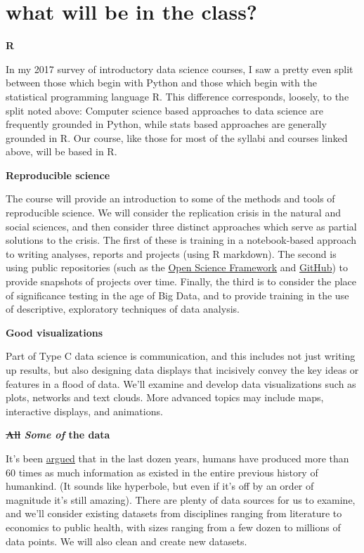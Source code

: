 \documentclass[openany]{book}
\begin{document}
\hypertarget{what-will-be-in-the-class}{%
\section*{what will be in the class?}\label{what-will-be-in-the-class}}

\textbf{R}

In my 2017 survey of introductory data science courses, I saw a pretty even split between those which begin with Python and those which begin with the statistical programming language R. This difference corresponds, loosely, to the split noted above: Computer science based approaches to data science are frequently grounded in Python, while stats based approaches are generally grounded in R. Our course, like those for most of the syllabi and courses linked above, will be based in R.

\textbf{Reproducible science}

The course will provide an introduction to some of the methods and tools of reproducible science. We will consider the replication crisis in the natural and social sciences, and then consider three distinct approaches which serve as partial solutions to the crisis. The first of these is training in a notebook-based approach to writing analyses, reports and projects (using R markdown). The second is using public repositories (such as the \href{https://osf.io/}{Open Science Framework} and \href{https://github.com/}{GitHub}) to provide snapshots of projects over time. Finally, the third is to consider the place of significance testing in the age of Big Data, and to provide training in the use of descriptive, exploratory techniques of data analysis.

\textbf{Good visualizations}

Part of Type C data science is communication, and this includes not just writing up results, but also designing data displays that incisively convey the key ideas or features in a flood of data. We'll examine and develop data visualizations such as plots, networks and text clouds. More advanced topics may include maps, interactive displays, and animations.

\textbf{\sout{All} \emph{Some of} the data}

It's been \href{https://www.udemy.com/datascience/learn/v4/t/lecture/3473822?start=379}{argued} that in the last dozen years, humans have produced more than 60 times as much information as existed in the entire previous history of humankind. (It sounds like hyperbole, but even if it's off by an order of magnitude it's still amazing). There are plenty of data sources for us to examine, and we'll consider existing datasets from disciplines ranging from literature to economics to public health, with sizes ranging from a few dozen to millions of data points. We will also clean and create new datasets.
\end{document}

